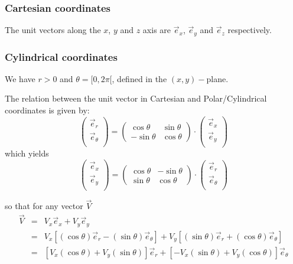 

\subsubsection{Cartesian coordinates}

The unit vectors along the $x$, $y$ and $z$ axis are 
$\vec{e}_x$, $\vec{e}_y$ and $\vec{e}_z$ respectively.

\subsubsection{Cylindrical coordinates}


We have $r>0$ and $\theta=[0,2\pi[$, defined in the $(x,y)-$plane.

The relation between the unit vector in Cartesian and Polar/Cylindrical coordinates
is given by:
\[
\left(
\begin{array}{c}
{\vec e}_{r} \\
{\vec e}_{\theta} \\
\end{array}
\right)
=
\left(
\begin{array}{cc}
\cos \theta & \sin \theta \\
-\sin \theta & \cos \theta
\end{array}
\right)
\cdot
\left(
\begin{array}{c}
{\vec e}_{x} \\
{\vec e}_{y} \\
\end{array}
\right)
\]
which yields
\[
\left(
\begin{array}{c}
{\vec e}_{x} \\
{\vec e}_{y} \\
\end{array}
\right)
=
\left(
\begin{array}{cc}
\cos \theta & -\sin \theta \\
\sin \theta & \cos \theta
\end{array}
\right)
\cdot
\left(
\begin{array}{c}
{\vec e}_{r} \\
{\vec e}_{\theta} \\
\end{array}
\right)
\]

so that for any vector ${\vec V}$
\begin{eqnarray}
{\vec V} 
&=& V_x {\vec e}_x  + V_y {\vec e}_y \nonumber\\
&=& V_x [(\cos \theta) {\vec e}_r - (\sin \theta) {\vec e}_\theta]  + 
    V_y [(\sin \theta) {\vec e}_r + (\cos \theta){\vec e}_\theta] \nonumber\\
&=& [V_x (\cos \theta) + V_y (\sin \theta)] {\vec e}_r +
[- V_x(\sin \theta) + V_y (\cos \theta)]{\vec e}_\theta  
\end{eqnarray}




